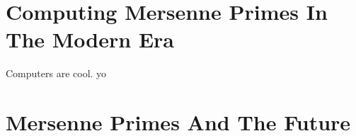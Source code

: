 \section{Computing Mersenne Primes In The Modern Era}
Computers are cool. yo
\section{Mersenne Primes And The Future}
